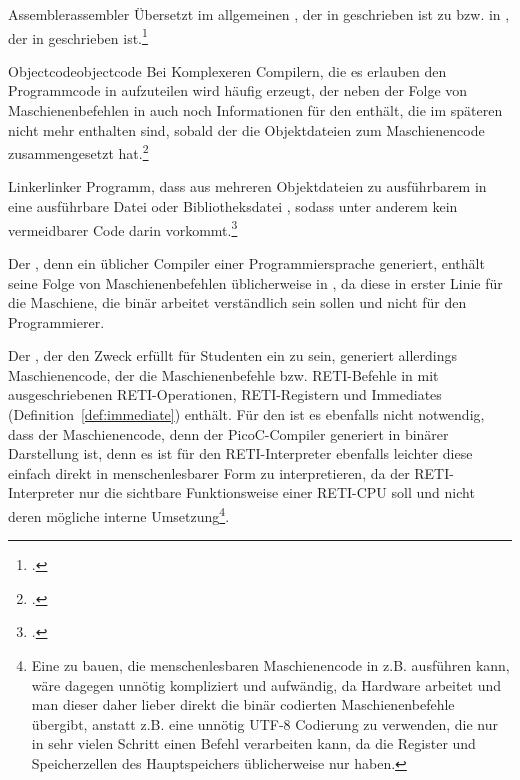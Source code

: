 \begin{Definition}{Assembler}{assembler}
  Übersetzt im allgemeinen , der in  geschrieben ist zu  bzw.  in , der in  geschrieben ist.\footcite{scholl_einfuhrung_2021}
\end{Definition}

\begin{Definition}{Objectcode}{objectcode}
  Bei Komplexeren Compilern, die es erlauben den Programmcode in  aufzuteilen wird häufig  erzeugt, der neben der Folge von Maschienenbefehlen in  auch noch Informationen für den  enthält, die im späteren  nicht mehr enthalten sind, sobald der  die Objektdateien zum Maschienencode zusammengesetzt hat.\footcite{scholl_einfuhrung_2021}
\end{Definition}

\begin{Definition}{Linker}{linker}
  Programm, dass  aus mehreren Objektdateien zu ausführbarem  in eine ausführbare Datei oder Bibliotheksdatei , sodass unter anderem kein vermeidbarer  Code darin vorkommt.\footcite{scholl_einfuhrung_2021}
\end{Definition}

Der , denn ein üblicher Compiler einer Programmiersprache generiert, enthält seine Folge von Maschienenbefehlen üblicherweise in , da diese in erster Linie für die Maschiene, die binär arbeitet verständlich sein sollen und nicht für den Programmierer.

Der , der den Zweck erfüllt für Studenten ein  zu sein, generiert allerdings Maschienencode, der die Maschienenbefehle bzw. RETI-Befehle in  mit ausgeschriebenen RETI-Operationen, RETI-Registern und Immediates (Definition~\ref{def:immediate}) enthält. Für den  ist es ebenfalls nicht notwendig, dass der Maschienencode, denn der PicoC-Compiler generiert in binärer Darstellung ist, denn es ist für den RETI-Interpreter ebenfalls leichter diese einfach direkt in menschenlesbarer Form zu interpretieren, da der RETI-Interpreter nur die sichtbare Funktionsweise einer RETI-CPU  soll und nicht deren mögliche interne Umsetzung\footnote{Eine  zu bauen, die menschenlesbaren Maschienencode in z.B.  ausführen kann, wäre dagegen unnötig kompliziert und aufwändig, da Hardware  arbeitet und man dieser daher lieber direkt die binär codierten Maschienenbefehle übergibt, anstatt z.B. eine unnötig  UTF-8 Codierung zu verwenden, die nur in sehr vielen Schritt einen Befehl verarbeiten kann, da die Register und Speicherzellen des Hauptspeichers üblicherweise nur  haben.}.

